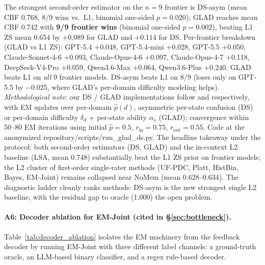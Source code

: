 \documentclass[11pt]{article}
\begin{document}
The strongest second-order estimator on the $n{=}9$ frontier is DS-asym (mean CBF 0.768, 8/9 wins vs.\ L1, binomial one-sided $p=0.020$); GLAD reaches mean CBF 0.742 with \textbf{9/9 frontier wins} (binomial one-sided $p=0.002$), beating L1 ZS mean 0.654 by $+$0.089 for GLAD and $+$0.114 for DS. Per-frontier breakdown (GLAD vs L1 ZS): GPT-5.4 $+$0.048, GPT-5.4-mini $+$0.028, GPT-5.5 $+$0.050, Claude-Sonnet-4-6 $+$0.093, Claude-Opus-4-6 $+$0.097, Claude-Opus-4-7 $+$0.118, DeepSeek-V4-Pro $+$0.059, Qwen3.6-Max $+$0.064, Qwen3.6-Plus $+$0.240. GLAD beats L1 on \emph{all} 9 frontier models. DS-asym beats L1 on 8/9 (loses only on GPT-5.5 by $-$0.025, where GLAD's per-domain difficulty modeling helps). \emph{Methodological note}: our DS / GLAD implementations follow \citet{dawid1979maximum} and \citet{whitehill2009glad} respectively, with EM updates over per-domain $\hat p(d)$, asymmetric per-state confusion (DS) or per-domain difficulty $\delta_d$ + per-state ability $\alpha_s$ (GLAD); convergence within 50--80 EM iterations using initial $\hat p=0.5$, $r_{\text{in}}=0.75$, $r_{\text{out}}=0.55$. Code at the anonymized repository/scripts/run\_glad\_ds.py. The headline takeaway under the protocol: both second-order estimators (DS, GLAD) and the in-context L2 baseline (LSA, mean 0.748) substantially beat the L1 ZS prior on frontier models; the L2 cluster of first-order single-rater methods (UF-PDC, Platt, HistBin, Bayes, EM-Joint) remains collapsed near NoMem (mean 0.628--0.634). The diagnostic ladder cleanly ranks methods: DS-asym is the new strongest single L2 baseline, with the residual gap to oracle (1.000) the open problem.

\paragraph{A6: Decoder ablation for EM-Joint (cited in \S\ref{sec:bottleneck}).}
\label{app:decoder_ablation}
Table~\ref{tab:decoder_ablation} isolates the EM machinery from the feedback decoder by running EM-Joint with three different label channels: a ground-truth oracle, an LLM-based binary classifier, and a regex rule-based decoder.
\end{document}
